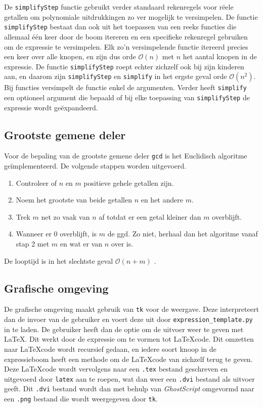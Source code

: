 \documentclass[a4paper]{article}
\newcommand{\ttt}[1]{\texttt{#1}}
\begin{document}
De \ttt{simplifyStep} functie gebruikt verder standaard rekenregels voor r\"eele getallen om polynomiale uitdrukkingen zo ver mogelijk te versimpelen. De functie \ttt{simplifyStep} bestaat dan ook uit het toepassen van een reeks functies die allemaal \'e\'en keer door de boom itereren en een specifieke rekenregel gebruiken om de expressie te versimpelen. Elk zo'n versimpelende functie itereerd precies een keer over alle knopen, en zijn dus orde $\mathcal O(n)$ met $n$ het aantal knopen in de expressie. De functie \ttt{simplifyStep} roept echter zichzelf ook bij zijn kinderen aan, en daarom zijn \ttt{simplifyStep} en \ttt{simplify} in het ergste geval orde $\mathcal O(n^2)$. Bij functies versimpelt de functie enkel de argumenten. Verder heeft \ttt{simplify} een optioneel argument die bepaald of bij elke toepassing van \ttt{simplifyStep} de expressie wordt ge\"expandeerd. 

\subsection{Grootste gemene deler}
Voor de bepaling van de grootste gemene deler \ttt{gcd} is het Euclidisch algoritme ge\"implementeerd. De volgende stappen worden uitgevoerd.
\begin{enumerate}
\item Controleer of $n$ en $m$ positieve gehele getallen zijn.
\item Noem het grootste van beide getallen $n$ en het andere $m$.
\item Trek $m$ net zo vaak van $n$ af totdat er een getal kleiner dan $m$ overblijft.
\item Wanneer er $0$ overblijft, is $m$ de ggd. Zo niet, herhaal dan het algoritme vanaf stap 2 met $m$ en wat er van $n$ over is.
\end{enumerate}
De looptijd is in het slechtste geval $\mathcal{O}(n+m)$ \cite{gcd}.

\subsection{Grafische omgeving}
De grafische omgeving maakt gebruik van  \ttt{tk} voor de weergave. Deze interpreteert dan de invoer van de gebruiker en voert deze uit door \ttt{expression\_template.py} in te laden. De gebruiker heeft dan de optie om de uitvoer weer te geven met \LaTeX. Dit werkt door de expressie om te vormen tot \LaTeX code. Dit omzetten naar \LaTeX code wordt recursief gedaan, en iedere soort knoop in de expressieboom heeft een methode om de \LaTeX code van zichzelf terug te geven. Deze \LaTeX code wordt vervolgens naar een \ttt{.tex} bestand geschreven en uitgevoerd door \ttt{latex} aan te roepen, wat dan weer een \ttt{.dvi} bestand als uitvoer geeft. Dit \ttt{.dvi} bestand wordt dan met behulp van \textit{GhostScript} omgevormd naar een \ttt{.png} bestand die wordt weergegeven door \ttt{tk}. 
\end{document}
